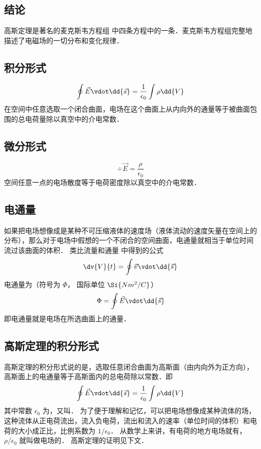 
\subsection{结论}

高斯定理是著名的麦克斯韦方程组%
中四条方程中的一条．麦克斯韦方程组完整地描述了电磁场的一切分布和变化规律．

\subsection{积分形式}    
\begin{equation}
\oint \vec E \vdot \dd{\vec s} = \frac{1}{\epsilon_0} \int \rho \dd{V}
\end{equation}               
在空间中任意选取一个闭合曲面，电场在这个曲面上从内向外的通量等于被曲面包围的总电荷量除以真空中的介电常数．

\subsection{微分形式} 
\begin{equation}
\div \vec E = \frac{\rho}{\epsilon_0}
\end{equation}                      
空间任意一点的电场散度等于电荷密度除以真空中的介电常数．

\subsection{电通量}

如果把电场想像成是某种不可压缩液体的速度场（液体流动的速度矢量在空间上的分布），那么对于电场中假想的一个不闭合的空间曲面，电通量就相当于单位时间流过该曲面的体积．
类比流量和通量%
中得到的公式
\begin{equation}
\dv{V}{t} = \oint \vec v \vdot \dd{\vec s}
\end{equation} 
电通量为（符号为 $\Phi $， 国际单位 $\Si{N m^2/C}$）
\begin{equation}
\Phi  = \oint \vec E \vdot \dd{\vec s}
\end{equation} 
即电通量就是电场在所选曲面上的通量．

\subsection{高斯定理的积分形式}

高斯定理的积分形式说的是，选取任意闭合曲面为高斯面（由内向外为正方向），高斯面上的电通量等于高斯面内的总电荷除以常数．即
\begin{equation}
\oint \vec E \vdot \dd{\vec s}  = \frac{1}{\epsilon_0} \int \rho \dd{V}
\end{equation} 
其中常数 $\epsilon_0$ 为，又叫． 为了便于理解和记忆，可以把电场想像成某种流体的场，这种流体从正电荷流出，流入负电荷，流出和流入的速率（单位时间的体积）和电荷的大小成正比，比例系数为 $1/\epsilon_0$． 从数学上来讲，有电荷的地方电场就有， $\rho /\epsilon_0$ 就叫做电场的． 高斯定理的证明见下文．


